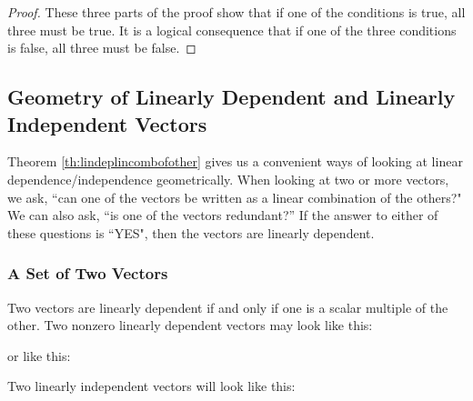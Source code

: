 \documentclass{ximera}
\begin{document}
\begin{proof}
These three parts of the proof show that if one of the conditions is true, all three must be true.  It is a logical consequence that if one of the three conditions is false, all three must be false.
 \end{proof}
 
\subsection*{Geometry of Linearly Dependent and Linearly Independent Vectors}

Theorem \ref{th:lindeplincombofother} gives us a convenient ways of looking at linear dependence/independence geometrically.  When looking at two or more vectors, we ask, ``can one of the vectors be written as a linear combination of the others?"  We can also ask, ``is one of the vectors redundant?''  If the answer to either of these questions is ``YES", then the vectors are linearly dependent.
\subsubsection*{A Set of Two Vectors}
Two vectors are linearly dependent if and only if one is a scalar multiple of the other.  Two nonzero linearly dependent vectors may look like this:
\begin{center}
\end{center}
or like this:
\begin{center}
\end{center}
Two linearly independent vectors will look like this:
\begin{center}
\end{center}
\end{document}

